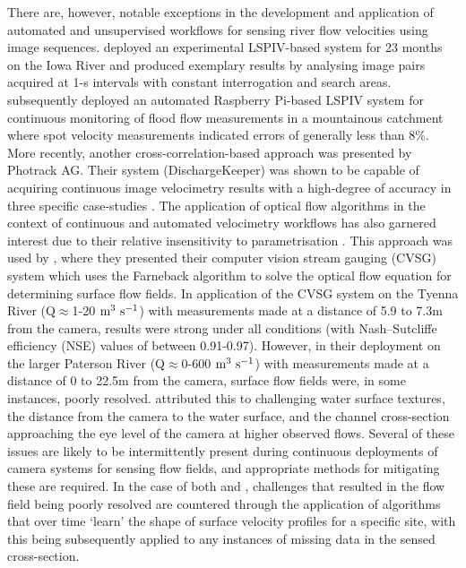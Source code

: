 \documentclass[hess, manuscript]{copernicus}
\begin{document}
There are, however, notable exceptions in the development and application of automated and unsupervised workflows for sensing river flow velocities using image sequences. \citet{Hauet2008} deployed an experimental LSPIV-based system for 23 months on the Iowa River and produced exemplary results by analysing image pairs acquired at 1-s intervals with constant interrogation and search areas. \citet{Ran2016} subsequently deployed an automated Raspberry Pi-based LSPIV system for continuous monitoring of flood flow measurements in a mountainous catchment where spot velocity measurements indicated errors of generally less than 8\%. More recently, another cross-correlation-based approach was presented by Photrack AG. Their system (DischargeKeeper) was shown to be capable of acquiring continuous image velocimetry results with a high-degree of accuracy in three specific case-studies \citep{Haro2021}. The application of optical flow algorithms in the context of continuous and automated velocimetry workflows has also garnered interest due to their relative insensitivity to parametrisation \citep[e.g.,][]{Pearce2020, Tosi2020}. This approach was used by \citet{Hutley2023}, where they presented their computer vision stream gauging (CVSG) system which uses the Farneback algorithm to solve the optical flow equation for determining surface flow fields. In application of the CVSG system on the Tyenna River (Q$\approx$1-20 $\textnormal{m\textsuperscript{3} s\textsuperscript{-1}}$) with measurements made at a distance of 5.9 to 7.3m from the camera, results were strong under all conditions (with Nash–Sutcliffe efficiency (NSE) values of between 0.91-0.97). However, in their deployment on the larger Paterson River (Q$\approx$0-600 $\textnormal{m\textsuperscript{3} s\textsuperscript{-1}}$) with measurements made at a distance of 0 to 22.5m from the camera, surface flow fields were, in some instances, poorly resolved. \citet{Hutley2023} attributed this to challenging water surface textures, the distance from the camera to the water surface, and the channel cross-section approaching the eye level of the camera at higher observed flows. Several of these issues are likely to be intermittently present during continuous deployments of camera systems for sensing flow fields, and appropriate methods for mitigating these are required. In the case of both \citet{Haro2021} and \citet{Hutley2023}, challenges that resulted in the flow field being poorly resolved are countered through the application of algorithms that over time `learn' the shape of surface velocity profiles for a specific site, with this being subsequently applied to any instances of missing data in the sensed cross-section. 
\end{document}
